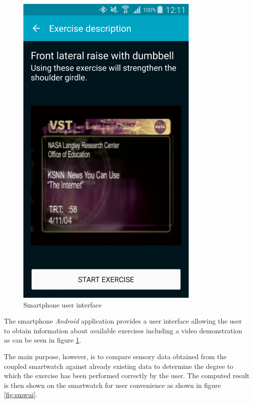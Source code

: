 \begin{figure}[t!]
\begin{minipage}{0.25\textwidth}
        \includegraphics[width=0.80\textwidth]{00_resources/figures/Android_Phone_DescriptionView.png}
    \end{minipage}
  \caption{Smartphone user interface}
  \label{fig:smpui}
\end{figure}

The smartphone \textit{Android} application provides a user interface allowing
the user to obtain information about available exercises including a video
demonstration as can be seen in figure \ref{fig:smpui}.

The main purpose, however, is to compare sensory data obtained from the coupled
smartwatch against already existing data to determine the degree to which
the exercise has been performed correctly by the user. The computed result is
then shown on the smartwatch for user convenience as shown in figure
\ref{fig:smwui}.

